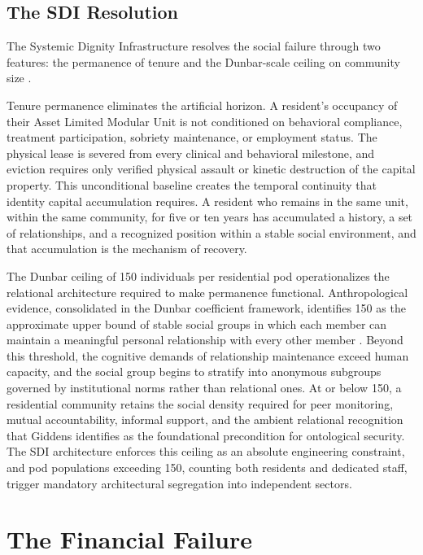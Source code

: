 \documentclass[12pt, letterpaper]{article}
\begin{document}
\subsection{The SDI Resolution}

The Systemic Dignity Infrastructure resolves the social failure through two features: the permanence of tenure and the Dunbar-scale ceiling on community size \citep{dibella_wp1_2026}.

Tenure permanence eliminates the artificial horizon. A resident's occupancy of their Asset Limited Modular Unit is not conditioned on behavioral compliance, treatment participation, sobriety maintenance, or employment status. The physical lease is severed from every clinical and behavioral milestone, and eviction requires only verified physical assault or kinetic destruction of the capital property. This unconditional baseline creates the temporal continuity that identity capital accumulation requires. A resident who remains in the same unit, within the same community, for five or ten years has accumulated a history, a set of relationships, and a recognized position within a stable social environment, and that accumulation is the mechanism of recovery.

The Dunbar ceiling of 150 individuals per residential pod operationalizes the relational architecture required to make permanence functional. Anthropological evidence, consolidated in the Dunbar coefficient framework, identifies 150 as the approximate upper bound of stable social groups in which each member can maintain a meaningful personal relationship with every other member \citep{dibella_wp1_2026}. Beyond this threshold, the cognitive demands of relationship maintenance exceed human capacity, and the social group begins to stratify into anonymous subgroups governed by institutional norms rather than relational ones. At or below 150, a residential community retains the social density required for peer monitoring, mutual accountability, informal support, and the ambient relational recognition that Giddens identifies as the foundational precondition for ontological security. The SDI architecture enforces this ceiling as an absolute engineering constraint, and pod populations exceeding 150, counting both residents and dedicated staff, trigger mandatory architectural segregation into independent sectors.


\section{The Financial Failure}
\end{document}
